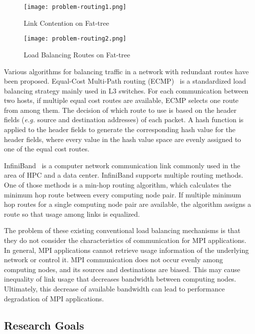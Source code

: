 \begin{figure}
    \centering
    \texttt{[image: problem-routing1.png]}
    \caption{Link Contention on Fat-tree}%
    \label{fig:problem-routing1}
\end{figure}

\begin{figure}
    \centering
    \texttt{[image: problem-routing2.png]}
    \caption{Load Balancing Routes on Fat-tree}%
    \label{fig:problem-routing2}
\end{figure}

Various algorithms for balancing traffic in a network with redundant
routes have been proposed. Equal-Cost Multi-Path routing (ECMP)~\autocite{ecmp} is
a standardized load balancing strategy mainly used in L3 switches. For each
communication between two hosts, if multiple equal cost routes are available,
ECMP selects one route from among them. The decision of which route to use is
based on the header fields (\emph{e.g.} source and destination addresses) of
each packet. A hash function is applied to the header fields to generate the
corresponding hash value for the header fields, where every value in the hash
value space are evenly assigned to one of the equal cost routes.

InfiniBand~\autocite{Buyya2009} is a computer network communication link
commonly used in the area of HPC and a data center. InfiniBand supports
multiple routing methods. One of those methods is a min-hop routing
algorithm, which calculates the minimum hop route between every
computing node pair. If multiple minimum hop routes for a single
computing node pair are available, the algorithm assigns a route so that
usage among links is equalized.

The problem of these existing conventional load balancing mechanisms is
that they do not consider the characteristics of communication for MPI
applications. In general, MPI applications cannot retrieve usage
information of the underlying network or control it. MPI communication
does not occur evenly among computing nodes, and its sources and
destinations are biased. This may cause inequality of link usage that
decreases bandwidth between computing nodes. Ultimately, this decrease
of available bandwidth can lead to performance degradation of MPI
applications.

\subsection{Research Goals}

